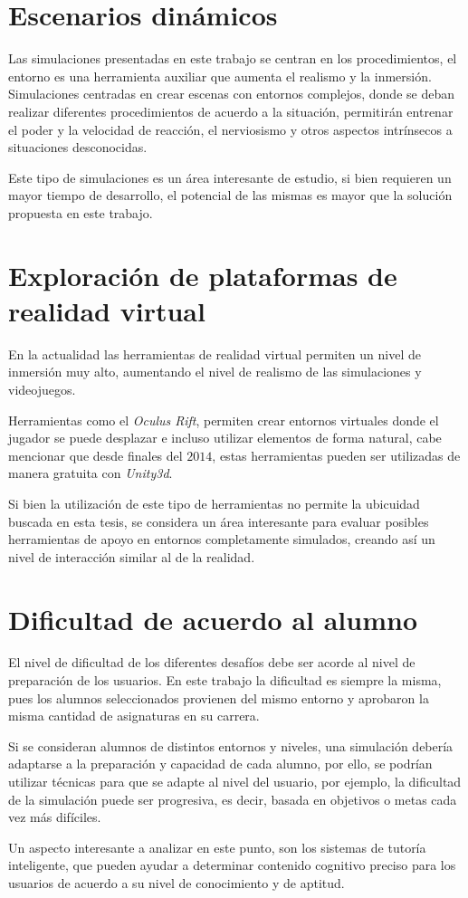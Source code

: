 \section{Escenarios dinámicos}

Las simulaciones presentadas en este trabajo se centran en los procedimientos,
el entorno es una herramienta auxiliar que aumenta el realismo y la inmersión.
Simulaciones centradas en crear escenas con entornos complejos, donde se deban
realizar diferentes procedimientos de acuerdo a la situación, permitirán
entrenar el poder y la velocidad de reacción, el nerviosismo y otros aspectos
intrínsecos a situaciones desconocidas. 

Este tipo de simulaciones es un área interesante de estudio, si bien requieren
un mayor tiempo de desarrollo, el potencial de las mismas es mayor que la
solución propuesta en este trabajo. 

\section{Exploración de plataformas de realidad virtual}

En la actualidad las herramientas de realidad virtual permiten un nivel de
inmersión muy alto, aumentando el nivel de realismo de las simulaciones y
videojuegos.     

Herramientas como el \emph{Oculus Rift}, permiten crear entornos virtuales donde
el jugador se puede desplazar e incluso utilizar elementos de forma
natural\cite{makerbot}, cabe mencionar que desde finales del $2014$, estas
herramientas pueden ser utilizadas de manera gratuita con
\emph{Unity3d}\cite{unity:vr}.

Si bien la utilización de este tipo de herramientas no permite la ubicuidad
buscada en esta tesis, se considera un área interesante para evaluar posibles
herramientas de apoyo en entornos completamente simulados, creando así un nivel
de interacción similar al de la realidad.


\section{Dificultad de acuerdo al alumno}

El nivel de dificultad de los diferentes desafíos debe ser acorde al nivel de
preparación de los usuarios. En este trabajo la dificultad es siempre la misma,
pues los alumnos seleccionados provienen del mismo entorno y aprobaron la misma
cantidad de asignaturas en su carrera.

Si se consideran alumnos de distintos entornos y niveles, una simulación debería adaptarse
a la preparación y capacidad de cada alumno, por ello, se podrían utilizar
técnicas para que se adapte al nivel del usuario, por ejemplo, la
dificultad de la simulación puede ser progresiva, es decir, basada en objetivos
o metas cada vez más difíciles.

Un aspecto interesante a analizar en este punto, son los sistemas de tutoría
inteligente, que pueden ayudar a determinar contenido cognitivo preciso para los
usuarios de acuerdo a su nivel de conocimiento y de aptitud.
